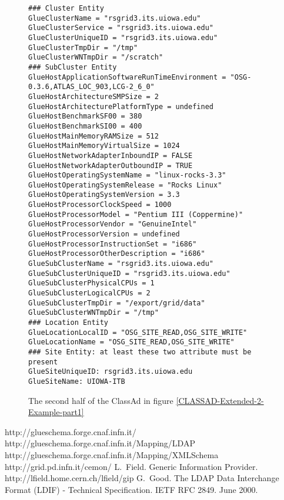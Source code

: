 \documentclass[12pt]{article}
\begin{document}
\begin{figure}
\scriptsize
\begin{verbatim}
### Cluster Entity
GlueClusterName = "rsgrid3.its.uiowa.edu"
GlueClusterService = "rsgrid3.its.uiowa.edu"
GlueClusterUniqueID = "rsgrid3.its.uiowa.edu"
GlueClusterTmpDir = "/tmp"
GlueClusterWNTmpDir = "/scratch"
### SubCluster Entity
GlueHostApplicationSoftwareRunTimeEnvironment = "OSG-0.3.6,ATLAS_LOC_903,LCG-2_6_0"
GlueHostArchitectureSMPSize = 2
GlueHostArchitecturePlatformType = undefined
GlueHostBenchmarkSF00 = 380
GlueHostBenchmarkSI00 = 400
GlueHostMainMemoryRAMSize = 512
GlueHostMainMemoryVirtualSize = 1024
GlueHostNetworkAdapterInboundIP = FALSE
GlueHostNetworkAdapterOutboundIP = TRUE
GlueHostOperatingSystemName = "linux-rocks-3.3"
GlueHostOperatingSystemRelease = "Rocks Linux"
GlueHostOperatingSystemVersion = 3.3
GlueHostProcessorClockSpeed = 1000
GlueHostProcessorModel = "Pentium III (Coppermine)"
GlueHostProcessorVendor = "GenuineIntel"
GlueHostProcessorVersion = undefined
GlueHostProcessorInstructionSet = "i686"
GlueHostProcessorOtherDescription = "i686"
GlueSubClusterName = "rsgrid3.its.uiowa.edu"
GlueSubClusterUniqueID = "rsgrid3.its.uiowa.edu"
GlueSubClusterPhysicalCPUs = 1
GlueSubClusterLogicalCPUs = 2
GlueSubClusterTmpDir = "/export/grid/data"
GlueSubClusterWNTmpDir = "/tmp"
### Location Entity
GlueLocationLocalID = "OSG_SITE_READ,OSG_SITE_WRITE"
GlueLocationName = "OSG_SITE_READ,OSG_SITE_WRITE"
### Site Entity: at least these two attribute must be present
GlueSiteUniqueID: rsgrid3.its.uiowa.edu
GlueSiteName: UIOWA-ITB

\end{verbatim}
\normalsize \caption[Example of an old ClassAd representation of the
GLUE Schema]{\label{CLASSAD-Extended-2-Example-part2} The second
half of the ClassAd in figure
\ref{CLASSAD-Extended-2-Example-part1}}
\end{figure}



\begin{thebibliography}{6}
 http://glueschema.forge.cnaf.infn.it/
 http://glueschema.forge.cnaf.infn.it/Mapping/LDAP
 http://glueschema.forge.cnaf.infn.it/Mapping/XMLSchema
 http://grid.pd.infn.it/cemon/
 L.~Field.
\newblock Generic Information Provider.
\newblock http://lfield.home.cern.ch/lfield/gip
G.~Good.
\newblock The LDAP Data Interchange Format (LDIF) - Technical
Specification.
\newblock IETF RFC 2849. June 2000.
\end{thebibliography}
\end{document}
